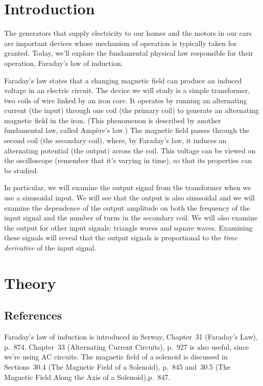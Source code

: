 \section{Introduction}

The generators that supply electricity to our homes and the motors in our cars
are important devices whose mechanism of operation is typically taken for 
granted. Today, we'll explore the fundamental physical law responsible for 
their operation, Faraday's law of induction.

Faraday's law states that a changing magnetic field can produce an induced 
voltage in an electric circuit.  The device we will study is a simple
transformer, two coils of wire linked by an iron core.  It operates by
running an alternating current (the input) through one coil (the primary coil)
to generate an alternating magnetic field in the iron. (This phenomenon is 
described by another fundamental law, called Amp\`{e}re's law.)  The magnetic 
field passes through the second coil (the secondary coil), where, by Faraday's 
law, it induces an alternating potential (the output) across the coil. This 
voltage can be viewed on the oscilloscope (remember that it's varying in time),
so that its properties can be studied.

In particular, we will examine the output signal from the transformer when we
use a sinusoidal input. We will see that the output is also sinusoidal and we
will examine the dependence of the output amplitude on both the frequency of
the input signal and the number of turns in the secondary coil. We will also
examine the output for other input signals: triangle waves and square waves.
Examining these signals will reveal that the output signals is proportional
to the {\it time derivative} of the input signal.

\vfill
\pagebreak

\section{Theory}

\subsection{References}

Faraday's law of induction is introduced in Serway, Chapter~31 (Faraday's
Law), p.~874.  Chapter~33 (Alternating Current Circuits), p.~927 is also 
useful, since we're using AC circuits.  The magnetic field of a solenoid is 
discussed in Sections~30.4 (The Magnetic Field of a Solenoid), p.~845 and~30.5
(The Magnetic Field Along the Axis of a Solenoid),p.~847.

